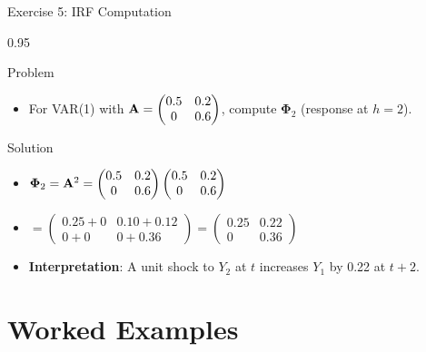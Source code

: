 \documentclass[9pt, aspectratio=169, t]{beamer}
\begin{document}
\begin{frame}{Exercise 5: IRF Computation}
    \begin{cminipage}{0.95\textwidth}
    \begin{alertblock}{Problem}
        \begin{itemize}\setlength{\itemsep}{0pt}
            \item For VAR(1) with $\mathbf{A} = \begin{pmatrix} 0.5 & 0.2 \\ 0 & 0.6 \end{pmatrix}$, compute $\boldsymbol{\Phi}_2$ (response at $h=2$).
        \end{itemize}
    \end{alertblock}

    \vspace{0.2cm}
    \begin{exampleblock}{Solution}
        \begin{itemize}\setlength{\itemsep}{0pt}
            \item $\boldsymbol{\Phi}_2 = \mathbf{A}^2 = \begin{pmatrix} 0.5 & 0.2 \\ 0 & 0.6 \end{pmatrix} \begin{pmatrix} 0.5 & 0.2 \\ 0 & 0.6 \end{pmatrix}$
            \item $= \begin{pmatrix} 0.25 + 0 & 0.10 + 0.12 \\ 0 + 0 & 0 + 0.36 \end{pmatrix} = \begin{pmatrix} 0.25 & 0.22 \\ 0 & 0.36 \end{pmatrix}$
            \item \textbf{Interpretation}: A unit shock to $Y_2$ at $t$ increases $Y_1$ by 0.22 at $t+2$.
        \end{itemize}
    \end{exampleblock}
    \end{cminipage}
\end{frame}

\section{Worked Examples}
\end{document}
